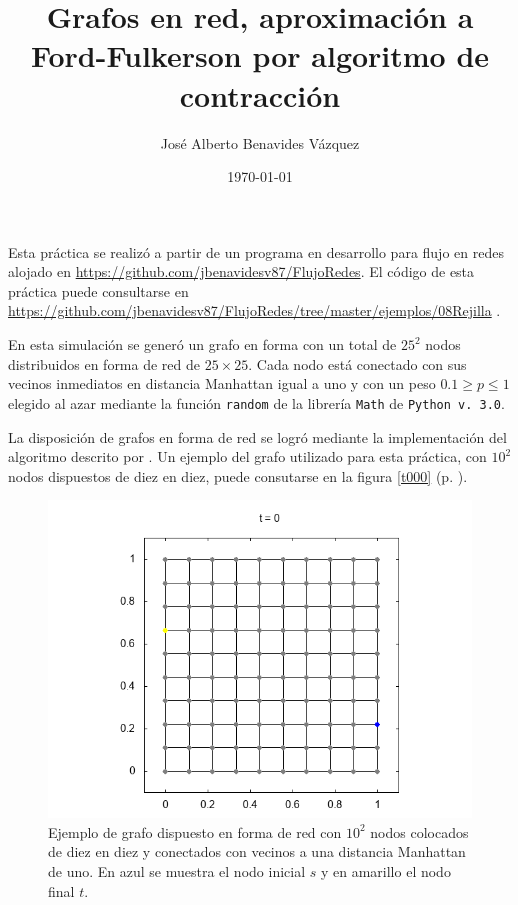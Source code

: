 \documentclass{article}
\title{Grafos en red, aproximación a Ford-Fulkerson por algoritmo de contracción}
\author{José Alberto Benavides Vázquez}
\date{\today}
\begin{document}
  \maketitle

  Esta práctica se realizó a partir de un programa en desarrollo para flujo en redes alojado en \url{https://github.com/jbenavidesv87/FlujoRedes}. El código de esta práctica puede consultarse en \url{https://github.com/jbenavidesv87/FlujoRedes/tree/master/ejemplos/08Rejilla} \citep{Grafos}.

  En esta simulación se generó un grafo en forma con un total de $25^2$ nodos distribuidos en forma de red de $25 \times 25$. Cada nodo está conectado con sus vecinos inmediatos en distancia Manhattan igual a uno y con un peso $0.1 \geq p \leq 1$ elegido al azar mediante la función \texttt{random} de la librería \texttt{Math} de \texttt{Python v. 3.0}.

  La disposición de grafos en forma de red se logró mediante la implementación del algoritmo descrito por \citep{manhattan}. Un ejemplo del grafo utilizado para esta práctica, con $10^2$ nodos dispuestos de diez en diez, puede consutarse en la figura \ref{t000} (p. \pageref{t000}).

  \begin{figure}[h]
    \includegraphics[width=1\textwidth]{t000}
    \centering
    \caption{Ejemplo de grafo dispuesto en forma de red con $10^2$ nodos colocados de diez en diez y conectados con vecinos a una distancia Manhattan de uno. En azul se muestra el nodo inicial $s$ y en amarillo el nodo final $t$.}
    \label{grafoEjemplo6}
  \end{figure}
\end{document}
